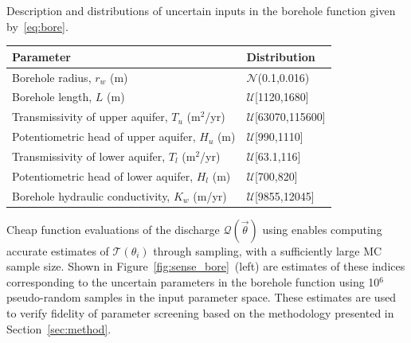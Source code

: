 \begin{table}[htbp]
\renewcommand*{\arraystretch}{1.2}
\caption{Description and distributions of uncertain inputs in the borehole function
given by~\eqref{eq:bore}.}
\label{tab:bore}
\end{table}
\begin{center}
\begin{tabular}{ll}
\toprule
\textbf{Parameter} & \textbf{Distribution} \\ 
\bottomrule
Borehole radius, $r_w$ (m) & $\mathcal{N}$(0.1,0.016) \\
Borehole length, $L$ (m) & $\mathcal{U}$[1120,1680] \\
Transmissivity of upper aquifer, $T_u$ (m$^2$/yr) & $\mathcal{U}$[63070,115600] \\
Potentiometric head of upper aquifer, $H_u$ (m) & $\mathcal{U}$[990,1110] \\
Transmissivity of lower aquifer, $T_l$ (m$^2$/yr) & $\mathcal{U}$[63.1,116] \\
Potentiometric head of lower aquifer, $H_l$ (m) & $\mathcal{U}$[700,820] \\
Borehole hydraulic conductivity, $K_w$ (m/yr) & $\mathcal{U}$[9855,12045] \\
\bottomrule
\end{tabular}
\end{center}

%
Cheap function evaluations of the discharge $\mathcal{Q}(\vec{\theta})$ using
enables computing accurate estimates of $\mathcal{T}(\theta_i)$ through
sampling, with a sufficiently large MC sample size.  Shown in
Figure~\ref{fig:sense_bore}~(left) are estimates of these indices corresponding to the
uncertain parameters in the borehole function using 10$^6$ pseudo-random
samples in the input parameter space. 
These estimates are used to verify fidelity of
parameter screening based on the methodology presented in Section~\ref{sec:method}. 

